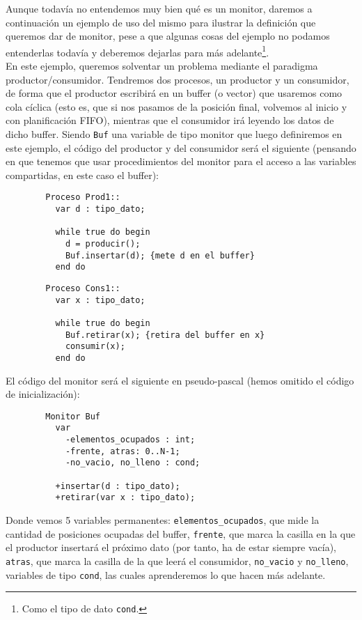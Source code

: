 \begin{ejemplo}
    Aunque todavía no entendemos muy bien qué es un monitor, daremos a continuación un ejemplo de uso del mismo para ilustrar la definición que queremos dar de monitor, pese a que algunas cosas del ejemplo no podamos entenderlas todavía y deberemos dejarlas para más adelante\footnote{Como el tipo de dato \texttt{cond}.}.\\

    En este ejemplo, queremos solventar un problema mediante el paradigma productor/consumidor. Tendremos dos procesos, un productor y un consumidor, de forma que el productor escribirá en un buffer (o vector) que usaremos como cola cíclica (esto es, que si nos pasamos de la posición final, volvemos al inicio y con planificación FIFO), mientras que el consumidor irá leyendo los datos de dicho buffer. Siendo \verb|Buf| una variable de tipo monitor que luego definiremos en este ejemplo, el código del productor y del consumidor será el siguiente (pensando en que tenemos que usar procedimientos del monitor para el acceso a las variables compartidas, en este caso el buffer):
    \begin{verbatim}
        Proceso Prod1::
          var d : tipo_dato;

          while true do begin
            d = producir();
            Buf.insertar(d); {mete d en el buffer}
          end do
    \end{verbatim}
    \begin{verbatim}
        Proceso Cons1::
          var x : tipo_dato;

          while true do begin
            Buf.retirar(x); {retira del buffer en x}
            consumir(x);
          end do
    \end{verbatim}
    El código del monitor será el siguiente en pseudo-pascal (hemos omitido el código de inicialización):
    \begin{verbatim}
        Monitor Buf
          var
            -elementos_ocupados : int;
            -frente, atras: 0..N-1;
            -no_vacio, no_lleno : cond;

          +insertar(d : tipo_dato);
          +retirar(var x : tipo_dato);
    \end{verbatim}
    Donde vemos 5 variables permanentes: \verb|elementos_ocupados|, que mide la cantidad de posiciones ocupadas del buffer, \verb|frente|, que marca la casilla en la que el productor insertará el próximo dato (por tanto, ha de estar siempre vacía), \verb|atras|, que marca la casilla de la que leerá el consumidor, \verb|no_vacio| y \verb|no_lleno|, variables de tipo \verb|cond|, las cuales aprenderemos lo que hacen más adelante.
    

\end{ejemplo}
